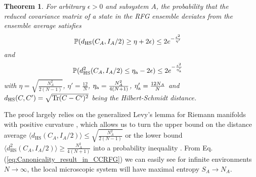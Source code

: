 \documentclass[twocolumn,english,prl,aps,superscriptaddress,amsmath,amssymb,floatfix]{revtex4-2}
\newtheorem{theorem}{Theorem}
\def \Tr {\mathrm{Tr}}
\begin{document}
\begin{theorem}
For arbitrary $\epsilon>0$ and subsystem $A$, the probability that the reduced covariance matrix of a state in the RFG ensemble deviates from the ensemble average satisfies %
\begin{equation}
\mathbb{P}(d_{\rm HS}(C_{A},%
I_{A}/2)\geq\eta+2\epsilon)\leq2e^{-\frac{\epsilon^{2}}{\eta'}}
\label{eq:Canonicality_result_in_CCRFG}
\end{equation}
and
\begin{equation}
\mathbb{P}(d_{\rm HS}^2(C_{A},%
I_{A}/2)\leq\eta_{\rm a}-2\epsilon)\le 2e^{-\frac{\epsilon^2}{\eta'_{\rm a}}}    
\label{eq:atypicality}
\end{equation}
with $\eta=\sqrt{\frac{N_{A}^{2}}{2(N-1)}}$, %
$\eta'=\frac{12}{N}$, $\eta_{\rm a}=\frac{N_A^2}{4(N+1)}$, $\eta'_{\rm a}=\frac{12N_A}{N}$ and $d_{\rm HS}(C,C')=\sqrt{\Tr(C-C')^2}$ being the Hilbert-Schmidt distance. 
\end{theorem}
The proof largely relies on the generalized Levy's lemma
for Riemann manifolds with positive curvature \citep{measure_concentration1,measure_concentration2,Meckes2019},
which allows us to turn the upper bound on %
the distance average $\langle d_{\mathrm{HS}}(C_{A},I_{A}/2)\rangle\leq\sqrt{\frac{N_A^2}{2(N-1)}}$ or the lower bound $\langle d^2_{\mathrm{HS}}(C_{A},I_{A}/2)\rangle\geq\frac{N_A^2}{4(N+1)}$
into a probability inequality \citep{SM}. %
From Eq. (\ref{eq:Canonicality_result_in_CCRFG}) we can easily see for
infinite environments $N\to\infty$, the local microscopic system will have maximal entropy
$S_{A}\to N_{A}$.
\end{document}
